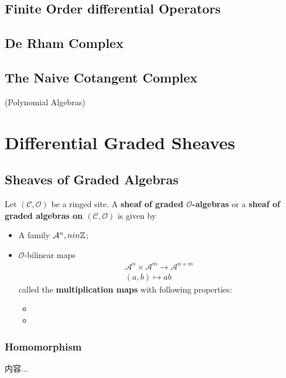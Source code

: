 \documentclass[Total.tex]{subfiles}
\begin{document}
			\subsection{Finite Order differential Operators}
			
			\subsection{De Rham Complex}
			
			\subsection{The Naive Cotangent Complex}
			
			\begin{Def}
				(Polynomial Algebras)
			\end{Def}
		\section{Differential Graded Sheaves}
			\subsection{Sheaves of Graded Algebras}
				\begin{Def}
					Let $(\mathcal{C},\mathcal{O})$ be a ringed site. A \textbf{sheaf of graded $\mathcal{O}$-algebras} or a \textbf{sheaf of graded algebras on $(\mathcal{C},\mathcal{O})$} is given by
					\begin{itemize}
						\item A family $\mathcal{A}^n,nin \mathbb{Z}$;
						\item $\mathcal{O}$-bilinear maps
						\begin{gather*}
							\mathcal{A}^n\times \mathcal{A}^m\rightarrow \mathcal{A}^{n+m}\\
							(a,b)\mapsto ab
						\end{gather*}
						called the \textbf{multiplication maps} with following properties:
						\begin{itemize}
							\item 
							\item 
						\end{itemize}
					\end{itemize}
				\end{Def}
				\subsubsection{Homomorphism}
				\begin{Def}
					内容...
				\end{Def}
\end{document}

